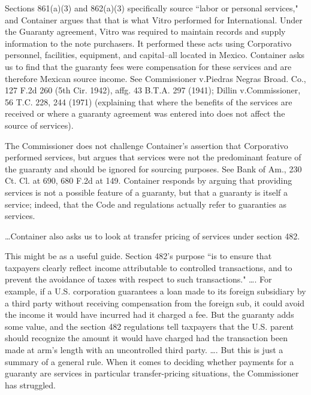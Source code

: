 \begin{select}
Sections 861(a)(3) and 862(a)(3) specifically source ``labor or personal services," and Container argues that that is what Vitro performed for International. Under the Guaranty agreement, Vitro was required to maintain records and supply information to the note purchasers. It performed these acts using Corporativo personnel, facilities, equipment, and capital--all located in Mexico. Container asks us to find that the guaranty fees were compensation for these services and are therefore Mexican source income. See Commissioner v.\@ Piedras Negras Broad. Co., 127 F.2d 260 (5th Cir. 1942), affg. 43 B.T.A. 297 (1941); Dillin v.\@ Commissioner, 56 T.C. 228, 244 (1971) (explaining that where the benefits of the services are received or where a guaranty agreement was entered into does not affect the source of services).

The Commissioner does not challenge Container's assertion that Corporativo performed services, but argues that services were not the predominant feature of the guaranty and should be ignored for sourcing purposes. See Bank of Am., 230 Ct. Cl. at 690, 680 F.2d at 149. Container responds by arguing that providing services is not a possible feature of a guaranty, but that a guaranty is itself a service; indeed, that the Code and regulations actually refer to guaranties as services.

\ldots Container also asks us to look at transfer pricing of services under section 482.

This might be as a useful guide. Section 482's purpose ``is to ensure that taxpayers clearly reflect income attributable to controlled transactions, and to prevent the avoidance of taxes with respect to such transactions." \ldots. For example, if a U.S. corporation guarantees a loan made to its foreign subsidiary by a third party without receiving compensation from the foreign sub, it could avoid the income it would have incurred had it charged a fee. But the guaranty adds some value, and the section 482 regulations tell taxpayers that the U.S. parent should recognize the amount it would have charged had the transaction been made at arm's length with an uncontrolled third party. \ldots. But this is just a summary of a general rule. When it comes to deciding whether payments for a guaranty are services in particular transfer-pricing situations, the Commissioner has struggled.


\end{select}
